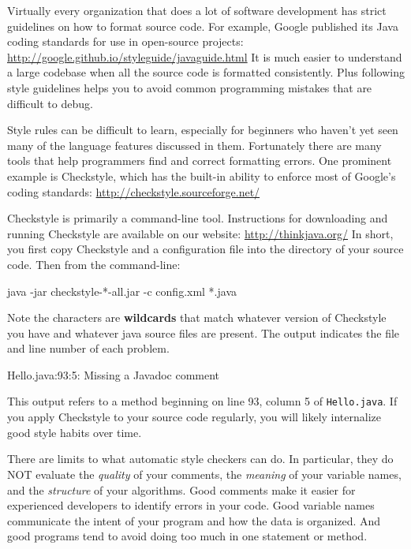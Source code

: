 
Virtually every organization that does a lot of software development has strict guidelines on how to format source code.
For example, Google published its Java coding standards for use in open-source projects:
\url{http://google.github.io/styleguide/javaguide.html}
It is much easier to understand a large codebase when all the source code is formatted consistently.
Plus following style guidelines helps you to avoid common programming mistakes that are difficult to debug.


Style rules can be difficult to learn, especially for beginners who haven't yet seen many of the language features discussed in them.
Fortunately there are many tools that help programmers find and correct formatting errors.
One prominent example is Checkstyle, which has the built-in ability to enforce most of Google's coding standards:
\url{http://checkstyle.sourceforge.net/}

Checkstyle is primarily a command-line tool.
Instructions for downloading and running Checkstyle are available on our website: \url{http://thinkjava.org/}
In short, you first copy Checkstyle and a configuration file into the directory of your source code.
Then from the command-line:

\begin{stdout}
    java -jar checkstyle-*-all.jar -c config.xml *.java
\end{stdout}


Note the {\tt *} characters are {\bf wildcards} that match whatever version of Checkstyle you have and whatever java source files are present.
The output indicates the file and line number of each problem.

\begin{stdout}
    Hello.java:93:5: Missing a Javadoc comment
\end{stdout}

This output refers to a method beginning on line 93, column 5 of {\tt Hello.java}.
If you apply Checkstyle to your source code regularly, you will likely internalize good style habits over time.

There are limits to what automatic style checkers can do.
In particular, they do NOT evaluate the {\em quality} of your comments, the {\em meaning} of your variable names, and the {\em structure} of your algorithms.
Good comments make it easier for experienced developers to identify errors in your code.
Good variable names communicate the intent of your program and how the data is organized.
And good programs tend to avoid doing too much in one statement or method.

